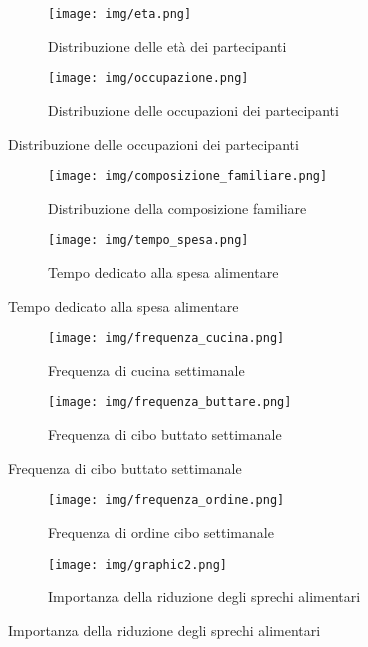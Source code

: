 \documentclass{article}
\begin{document}
\begin{figure}[h]
    \centering
    \begin{subfigure}{0.40\textwidth}
        \centering
        \texttt{[image: img/eta.png]}
        \caption{Distribuzione delle età dei partecipanti}
    \end{subfigure}
    \hfill
    \begin{subfigure}{0.40\textwidth}
        \centering
        \texttt{[image: img/occupazione.png]}
        \caption{Distribuzione delle occupazioni dei partecipanti}
    \end{subfigure}
\end{figure}

\begin{figure}[h]
    \centering
    \begin{subfigure}{0.40\textwidth}
        \centering
        \texttt{[image: img/composizione\_familiare.png]}
        \caption{Distribuzione della composizione familiare}
    \end{subfigure}
    \hfill
    \begin{subfigure}{0.40\textwidth}
        \centering
        \texttt{[image: img/tempo\_spesa.png]}
        \caption{Tempo dedicato alla spesa alimentare}
    \end{subfigure}
\end{figure}

\begin{figure}[h]
    \centering
    \begin{subfigure}{0.40\textwidth}
        \centering
        \texttt{[image: img/frequenza\_cucina.png]}
        \caption{Frequenza di cucina settimanale}
    \end{subfigure}
    \hfill
    \begin{subfigure}{0.40\textwidth}
        \centering
        \texttt{[image: img/frequenza\_buttare.png]}
        \caption{Frequenza di cibo buttato settimanale}
    \end{subfigure}
\end{figure}

\begin{figure}[h]
    \centering
    \begin{subfigure}{0.40\textwidth}
        \centering
        \texttt{[image: img/frequenza\_ordine.png]}
        \caption{Frequenza di ordine cibo settimanale}
    \end{subfigure}
    \hfill
    \begin{subfigure}{0.40\textwidth}
        \centering
        \texttt{[image: img/graphic2.png]}
        \caption{Importanza della riduzione degli sprechi alimentari}
    \end{subfigure}
\end{figure}
\end{document}
